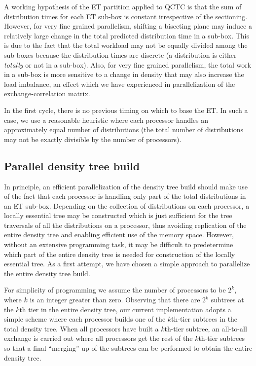 \commentoutA{\documentclass[prl,aps,twocolumn,twocolumngrid,superbib]{revtex4}}
\begin{document}
A working hypothesis of the ET partition applied to QCTC is that the
sum of distribution times for each ET sub-box is constant irrespective
of the sectioning. However, for very fine grained parallelism,
shifting a bisecting plane may induce a relatively large change in the
total predicted distribution time in a sub-box. This is due to the
fact that the total workload may not be equally divided among the
sub-boxes because the distribution times are discrete (a distribution
is either {\it totally} or not in a sub-box).  Also, for very fine
grained parallelism, the total work in a sub-box is more sensitive to
a change in density that may also increase the load imbalance, an
effect which we have experienced in parallelization of the
exchange-correlation matrix\cite{CGan03}.

In the first cycle, there is no previous timing on which to base the
ET. In such a case, we use a reasonable heuristic where each processor
handles an approximately equal number of distributions (the total
number of distributions may not be exactly divisible by the number of
processors).

\subsection{Parallel density tree build} 
\label{sec:parallelTB}

In principle, an efficient parallelization of the density tree build
should make use of the fact that each processor is handling only part
of the total distributions in an ET sub-box.  Depending on the
collection of distributions on each processor, a locally essential
tree\cite{MWarren92,CGan03} may be constructed which is just sufficient for the tree
traversals of all the distributions on a
processor, thus avoiding replication of the
entire density tree and enabling efficient use of the memory space.
However, without an extensive programming task, it may be difficult to
predetermine which part of the entire density tree is needed for
construction of the locally essential tree. As a first attempt, we
have chosen a simple approach to parallelize the entire density tree
build.

For simplicity of programming we assume the number of processors to be
$2^k$, where $k$ is an integer greater than zero.  Observing that
there are $2^k$ subtrees at the $k$th tier in the entire density tree,
our current implementation adopts a simple scheme where each processor
builds one of the $k$th-tier subtrees in the total density tree. When
all processors have built a $k$th-tier subtree, an all-to-all exchange
is carried out where all processors get the rest of the $k$th-tier
subtrees so that a final ``merging'' up of the
subtrees\cite{MChallacombe97,CTymczak04a} can be performed to obtain
the entire density tree.
\end{document}
